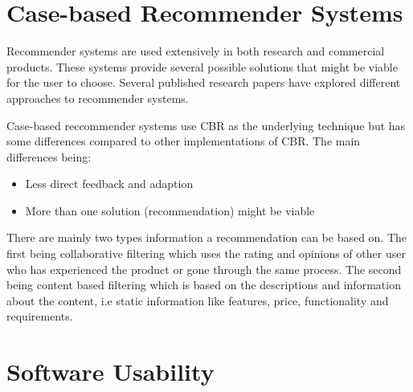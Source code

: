 \section{Case-based Recommender Systems}\label{sec:case_based_recommender_systems}
Recommender systems are used extensively in both research and commercial products. These systems provide several possible solutions that might be viable for the user to choose. Several published research papers have explored different approaches to recommender systems\cite{mulyana2015case}\cite{quijano2011happy}.

Case-based reccommender systems use CBR as the underlying technique but has some differences compared to other implementations of CBR. The main differences being:
 
\begin{itemize}
    \item Less direct feedback and adaption
    \item More than one solution (recommendation) might be viable
\end{itemize}

There are mainly two types information a recommendation can be based on. The first being collaborative filtering which uses the rating and opinions of other user who has experienced the product or gone through the same process. The second being content based filtering which is based on the descriptions and information about the content, i.e static information like features, price, functionality and requirements. 



\section{Software Usability}




\cleardoublepage
